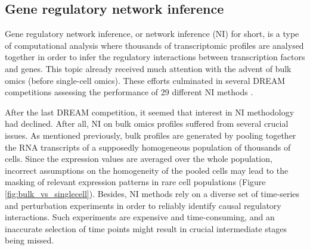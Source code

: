 
\subsection{Gene regulatory network inference}
Gene regulatory network inference, or network inference (NI) for short, is a type of computational analysis where thousands of transcriptomic profiles are analysed together in order to infer the regulatory interactions between transcription factors and genes. This topic already received much attention with the advent of bulk omics (before single-cell omics). These efforts culminated in several DREAM competitions assessing the performance of 29 different NI methods \cite{marbach_revealingstrengthsweaknesses_2010, marbach_wisdomcrowdsrobust_2012}. 

After the last DREAM competition, it seemed that interest in NI methodology had declined. After all, NI on bulk omics profiles suffered from several crucial issues. As mentioned previously, bulk profiles are generated by pooling together the RNA transcripts of a supposedly homogeneous population of thousands of cells. Since the expression values are averaged over the whole population, incorrect assumptions on the homogeneity of the pooled cells may lead to the masking of relevant expression patterns in rare cell populations (Figure \ref{fig:bulk_vs_singlecell}). Besides, NI methods rely on a diverse set of time-series and perturbation experiments in order to reliably identify causal regulatory interactions. Such experiments are expensive and time-consuming, and an inaccurate selection of time points might result in crucial intermediate stages being missed.

